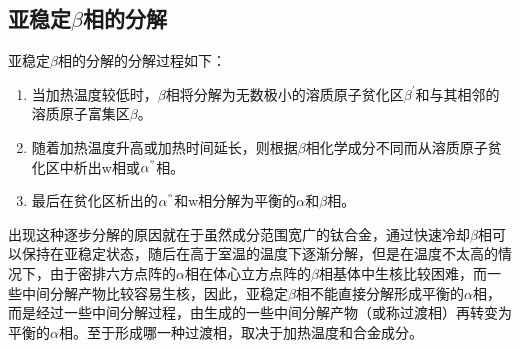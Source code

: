 \subsection*{亚稳定$\beta$相的分解}
亚稳定$\beta$相的分解的分解过程如下：
\begin{enumerate}
	\item  当加热温度较低时，$\beta$相将分解为无数极小的溶质原子贫化区$ \beta^{'} $和与其相邻的溶质原子富集区$\beta$。
	\item  随着加热温度升高或加热时间延长，则根据$\beta$相化学成分不同而从溶质原子贫化区中析出w相或$ \alpha^{"} $相。
	\item  最后在贫化区析出的$ \alpha^{"} $和w相分解为平衡的$\alpha$和$\beta$相。
\end{enumerate}

出现这种逐步分解的原因就在于虽然成分范围宽广的钛合金，通过快速冷却$\beta$相可以保持在亚稳定状态，随后在高于室温的温度下逐渐分解，但是在温度不太高的情况下，由于密排六方点阵的$\alpha$相在体心立方点阵的$\beta$相基体中生核比较困难，而一些中间分解产物比较容易生核，因此，亚稳定$\beta$相不能直接分解形成平衡的$\alpha$相，而是经过一些中间分解过程，由生成的一些中间分解产物（或称过渡相）再转变为平衡的$\alpha$相。至于形成哪一种过渡相，取决于加热温度和合金成分。
%
%
%
